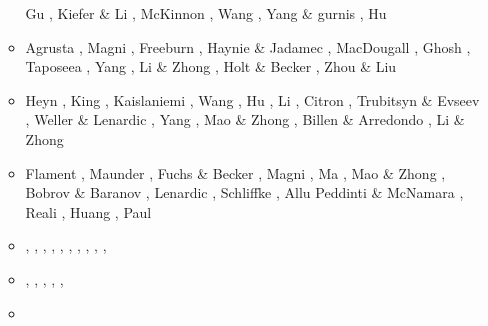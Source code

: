\begin{itemize}
\begin{scriptsize}
\begin{itemize}
                    Gu \etal \cite{gulm16}, Kiefer \& Li \cite{kili16},
                    McKinnon \etal \cite{mcnw16}, Wang \etal \cite{wahz16},
                    Yang \& gurnis \cite{yagu16}, Hu \etal \cite{hulh16}
\item[\twothousandseventeen] Agrusta \etal \cite{aggv17}, Magni \etal \cite{maav17},
                       Freeburn \etal \cite{frbm17}, Haynie \& Jadamec \cite{haja17},
                       MacDougall \etal \cite{majf17}, Ghosh \etal \cite{ghts17},
                       Taposeea \etal \cite{taac17}, Yang \etal \cite{yagz17},
                       Li \& Zhong \cite{lizh17}, Holt \& Becker \cite{hobe17},
                       Zhou \& Liu \cite{zhli17}
\item[\twothousandeighteen] Heyn \etal \cite{hect18}, King \cite{king18},
                    Kaislaniemi \etal \cite{kavb18}, Wang \etal \cite{wavp18},
                    Hu \etal \cite{hulz18}, Li \etal \cite{lizo18},
                    Citron \etal \cite{cimt18}, Trubitsyn \& Evseev \cite{trev18},
                    Weller \& Lenardic \cite{wele18}, Yang \etal \cite{yagz18},
                    Mao \& Zhong \cite{mazh18}, Billen \& Arredondo \cite{biar18},
                    Li \& Zhong \cite{lizh19}
\item[\twothousandnineteen] Flament \cite{flam19}, Maunder \etal \cite{mavb19},
                    Fuchs \& Becker \cite{fube19}, Magni \cite{magn19}, 
                    Ma \etal \cite{malg19}, Mao \& Zhong \cite{mazh19},
                    Bobrov \& Baranov \cite{boba19}, Lenardic \etal \cite{lewh19},
                    Schliffke \etal \cite{scvm19}, Allu Peddinti \& McNamara \cite{almc19},
                    Reali \etal \cite{rejv19}, Huang \etal \cite{huzl19},
                    Paul \etal \cite{pagc19}
\item[\twothousandtwenty]    \textcite{weki20},  \textcite{braf20},  \textcite{pagh20},
                             \textcite{vamg20},  \textcite{heyg20},  \textcite{loru20}, 
                             \textcite{bill20},  \textcite{sele20},
                             \textcite{dazl20},  \textcite{wali20}, 
\item[\twothousandtwentyone] \textcite{cafm21},  \textcite{ligl21},
                             \textcite{scvg21},  \textcite{ligl21b},
                             \textcite{wali21},  \textcite{cafb21}
\item[\twothousandtwentytwo] \textcite{limc22} 
\end{itemize}
\end{scriptsize}



\end{itemize}
